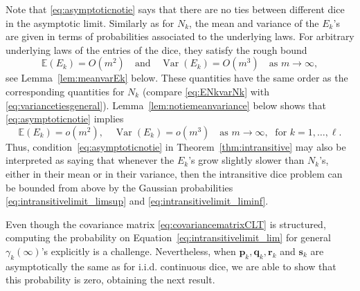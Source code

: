 \documentclass[reqno,a4paper,11pt]{amsart}
\theoremstyle{remark}
\newcommand{\mc}[1]{{\mathcal #1}}
\newcommand{\mb}[1]{{\mathbf #1}}
\newcommand{\bb}[1]{{\mathbb #1}}
\numberwithin{equation}{section}
\newcommand{\var}[1]{\operatorname{Var}\left(#1\right)}
\begin{document}
%

Note that \eqref{eq:asymptoticnotie} says that there are no ties between different dice in the asymptotic limit. Similarly as for $N_k$, the mean and variance of the $E_k$'s are given in terms of probabilities associated to the underlying laws. For arbitrary underlying laws of the entries of the dice, they satisfy the rough bound
%
\begin{equation}\label{eq:variancetiesgeneral}
\bb E (E_k)=O(m^2)\quad \text{and}\quad \var{E_k}=O(m^3)\quad \text{as } m\to\infty,
\end{equation}
%
see Lemma~\ref{lem:meanvarEk} below. These quantities have the same order as the corresponding quantities for $N_k$ (compare \eqref{eq:ENkvarNk} with \eqref{eq:variancetiesgeneral}). Lemma~\ref{lem:notiemeanvariance} below shows that \eqref{eq:asymptoticnotie} implies
%
\begin{equation}\label{eq:variancetiesslow}
\bb E (E_k)=o(m^2),\quad \var{E_k}=o(m^3)\quad \text{as } m\to\infty, \; \text{ for }k=1,\hdots, \ell.
\end{equation}
%
Thus, condition~\eqref{eq:asymptoticnotie} in Theorem~\ref{thm:intransitive}
may also be interpreted as saying that whenever the $E_k$'s grow slightly
slower than $N_k$'s, either in their mean or in their variance, then the
intransitive dice problem can be bounded from above by the Gaussian
probabilities \eqref{eq:intransitivelimit_limsup} and
\eqref{eq:intransitivelimit_liminf}. 

Even though the covariance matrix \eqref{eq:covariancematrixCLT} is structured,
computing the probability on Equation~\eqref{eq:intransitivelimit_lim} for general $\gamma_k(\infty)$'s explicitly is a challenge. Nevertheless, when $\mb p_k,\mb q_k,\mb r_k$ and $\mb s_k$ are asymptotically the same as for i.i.d. continuous dice, we are able to show that this probability is zero, obtaining the next result.
\end{document}
